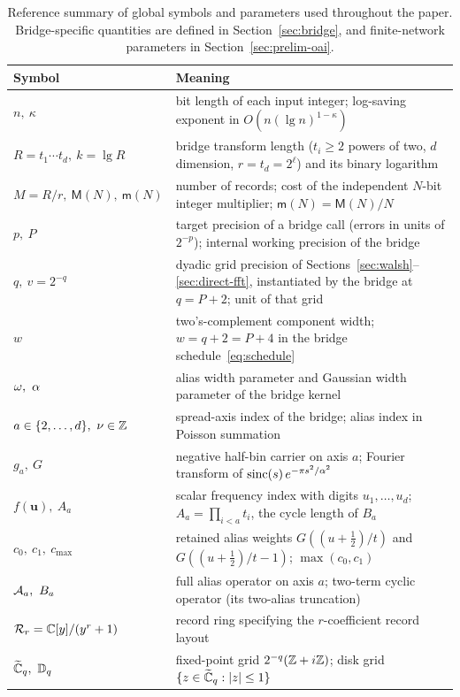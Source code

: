 \begin{table}[!t]
\centering
\small
\renewcommand{\arraystretch}{0.92}
\caption{Reference summary of global symbols and parameters used throughout the paper. Bridge-specific quantities are defined in Section~\ref{sec:bridge}, and finite-network parameters in Section~\ref{sec:prelim-oai}.}
\label{tab:notation}
\begin{tabular}{@{}>{\raggedright}p{}>{\raggedright\arraybackslash}p{}@{}}
\toprule
Symbol & Meaning\\
\midrule
$n,\ \kappa$ & bit length of each input integer; log-saving exponent in $O(n(\lg n)^{1-\kappa})$\\
$R=t_1\cdots t_d,\ k=\lg R$ & bridge transform length ($t_i\ge 2$ powers of two, $d$ dimension, $r=t_d=2^\ell$) and its binary logarithm\\
$M=R/r,\ \mathsf M(N),\ \mathsf m(N)$ & number of records; cost of the independent $N$-bit integer multiplier; $\mathsf m(N)=\mathsf M(N)/N$\\
$p,\ P$ & target precision of a bridge call (errors in units of $2^{-p}$); internal working precision of the bridge\\
$q,\ v=2^{-q}$ & dyadic grid precision of Sections~\ref{sec:walsh}--\ref{sec:direct-fft}, instantiated by the bridge at $q=P+2$; unit of that grid\\
$w$ & two's-complement component width; $w=q+2=P+4$ in the bridge schedule~\eqref{eq:schedule}\\
$\tw,\ \alpha$ & alias width parameter and Gaussian width parameter of the bridge kernel\\
$a\in\{2,\dots,d\},\ \nu\in\mathbb{Z}$ & spread-axis index of the bridge; alias index in Poisson summation\\
$g_a,\ G$ & negative half-bin carrier on axis $a$; Fourier transform of $\operatorname{sinc}(s)\,e^{-\pi s^2/\alpha^2}$\\
$f(\mathbf u),\ A_a$ & scalar frequency index with digits $u_1,\dots,u_d$; $A_a=\prod_{i<a}t_i$, the cycle length of $B_a$\\
$c_0,\ c_1,\ c_{\max}$ & retained alias weights $G((u+\tfrac12)/t)$ and $G((u+\tfrac12)/t-1)$; $\max(c_0,c_1)$\\
$\cA_a,\ B_a$ & full alias operator on axis $a$; two-term cyclic operator (its two-alias truncation)\\
$\mathcal{R}_r=\mathbb{C}[y]/(y^r+1)$ & record ring specifying the $r$-coefficient record layout\\
$\Cg_q,\ \mathbb{D}_q$ & fixed-point grid $2^{-q}(\mathbb{Z}+i\mathbb{Z})$; disk grid $\{z\in\widetilde{\mathbb{C}}_q:|z|\le 1\}$\\

\end{tabular}
\end{table}
